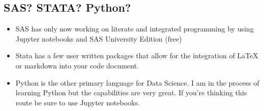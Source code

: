 \documentclass[]{article}
\providecommand{\tightlist}{%
  \setlength{\itemsep}{0pt}\setlength{\parskip}{0pt}}
\begin{document}
\subsection{SAS? STATA? Python?}\label{sas-stata-python}

\begin{itemize}
\tightlist
\item
  SAS has only now working on literate and integrated programming by
  using Jupyter notebooks and SAS University Edition (free)
\item
  Stata has a few user written packages that allow for the integration
  of LaTeX or markdown into your code document.
\item
  Python is the other primary language for Data Science. I am in the
  process of learning Python but the capabilities are very great. If
  you're thinking this route be sure to use Jupyter notebooks.
\end{itemize}
\end{document}
